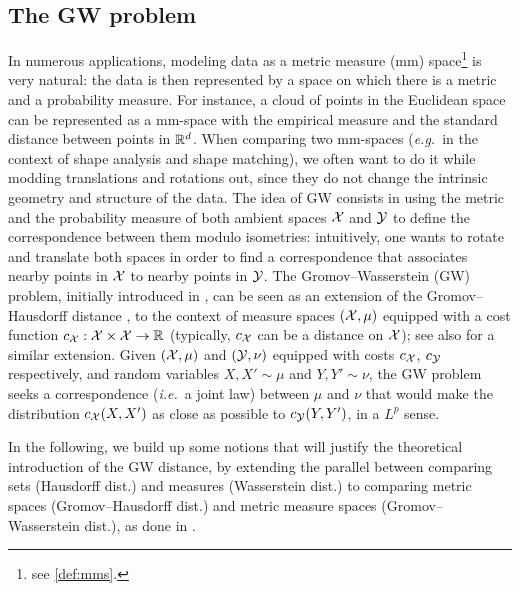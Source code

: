     \subsection{The GW problem}
        \label{sec:gw-problem}
        In numerous applications, modeling data as a metric measure (mm) space\footnote{see \cref{def:mms}.} is very natural: the data is then represented by a space on which there is a metric and a probability measure. For instance, a cloud of points in the Euclidean space can be represented as a mm-space with the empirical measure and the standard distance between points in $\mathbb{R}^d$. When comparing two mm-spaces (\textit{e.g.}~in the context of shape analysis and shape matching), we often want to do it while modding translations and rotations out, since they do not change the intrinsic geometry and structure of the data. The idea of GW consists in using the metric and the probability measure of both ambient spaces $\mathcal{X}$ and $\mathcal{Y}$ to define the correspondence between them modulo isometries: intuitively, one wants to rotate and translate both spaces in order to find a correspondence that associates nearby points in $\mathcal{X}$ to nearby points in $\mathcal{Y}$. The Gromov--Wasserstein (GW) problem, initially introduced in \cite{memoli2011gromov}, can be seen as an extension of the Gromov--Hausdorff distance \cite{gromov1999metric}, to the context of measure spaces $(\mathcal{X},\mu)$ equipped with a cost function $c_{\mathcal{X}} : \mathcal{X} \times \mathcal{X} \to \mathbb{R}$ (typically, $c_{\mathcal{X}}$ can be a distance on $\mathcal{X}$); see also \cite{sturm2006geometry} for a similar extension.
Given $(\mathcal{X},\mu)$ and $(\mathcal{Y},\nu)$ equipped with costs $c_{\mathcal{X}}$, $c_{\mathcal{Y}}$ respectively, and random variables $X,X' \sim \mu$ and $Y,Y' \sim \nu$, the GW problem seeks a correspondence (\textit{i.e.}~a joint law) between $\mu$ and $\nu$ that would make the distribution $c_{\mathcal{X}}(X,X')$ as close as possible to $c_{\mathcal{Y}}(Y,Y')$, in a $L^p$ sense.

        In the following, we build up some notions that will justify the theoretical introduction of the GW distance, by extending the parallel between comparing sets (Hausdorff dist.) and measures (Wasserstein dist.) to comparing metric spaces (Gromov--Hausdorff dist.) and metric measure spaces (Gromov--Wasserstein dist.), as done in \cite{memoli2011gromov}.


